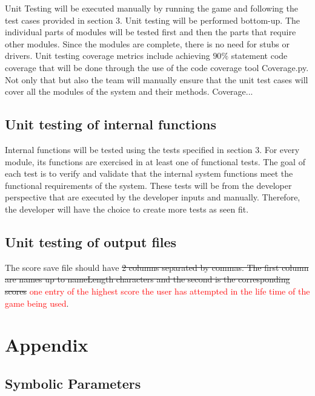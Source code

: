 \documentclass[12pt, titlepage]{article}
\begin{document}
Unit Testing will be executed manually by running the game and following the test cases provided in section 3. Unit testing will be performed bottom-up. The individual parts of modules will be tested first and then the parts that require other modules. Since the modules are complete, there is no need for stubs or drivers.
Unit testing coverage metrics include achieving $90\%$ statement code coverage that will be done through the use of the code coverage tool Coverage.py. Not only that but also the team will manually ensure that the unit test cases will cover all the modules of the system and their methods. 
Coverage...
		
\subsection{Unit testing of internal functions}

Internal functions will be tested using the tests specified in section 3. For every module, its functions are exercised in at least one of functional tests. The goal of each test is to verify and validate that the internal system functions meet the functional requirements of the system. These tests will be from the developer perspective that are executed by the developer inputs and manually. Therefore, the developer will have the choice to create more tests as seen fit.
		
\subsection{Unit testing of output files}

The score save file should have \st{2 columns separated by commas. The first column are names up to nameLength characters and the second is the corresponding scores} \textcolor{red}{one entry of the highest score the user has attempted in the life time of the game being used}.





\newpage

\section{Appendix}


\subsection{Symbolic Parameters}
\end{document}
